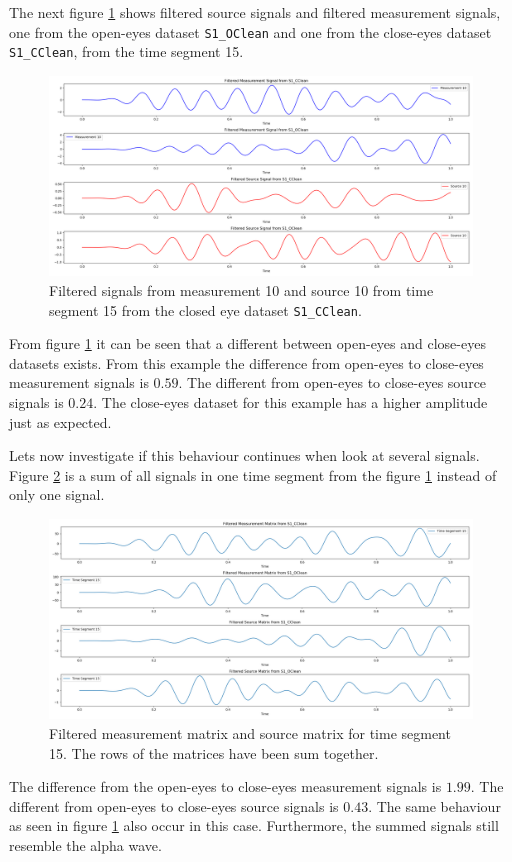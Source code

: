 The next figure \ref{fig:dft_2} shows filtered source signals and filtered measurement signals, one from the open-eyes dataset \texttt{S1\_OClean} and one from the close-eyes dataset \texttt{S1\_CClean}, from the time segment 15.
\begin{figure}[H]
\centering
\includegraphics[scale=0.28]{figures/ch_7/DFT_plot_X_and_Y_signal_timeseg15_source10.png}
\caption{Filtered signals from measurement 10 and source 10 from time segment 15 from the closed eye dataset \texttt{S1\_CClean}.}
\label{fig:dft_2}
\end{figure}
\noindent
From figure \ref{fig:dft_2} it can be seen that a different between open-eyes and close-eyes datasets exists. From this example the difference from open-eyes to close-eyes measurement signals is $0.59$. The different from open-eyes to close-eyes source signals is $0.24$.
The close-eyes dataset for this example has a higher amplitude just as expected. 

Lets now investigate if this behaviour continues when look at several signals. Figure \ref{fig:dft_3} is a sum of all signals in one time segment from the figure \ref{fig:dft_2} instead of only one signal.
\begin{figure}[H]
\centering
\includegraphics[scale=0.28]{figures/ch_7/DFT_plot_X_and_Y_matrix_timeseg15.png}
\caption{Filtered measurement matrix and source matrix for time segment 15. The rows of the matrices have been sum together.}
\label{fig:dft_3}
\end{figure}
\noindent
The difference from the open-eyes to close-eyes measurement signals is $1.99$. The different from open-eyes to close-eyes source signals is $0.43$. The same behaviour as seen in figure \ref{fig:dft_2} also occur in this case. Furthermore, the summed signals still resemble the alpha wave. 


